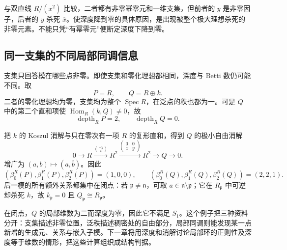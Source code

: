 与双直线 \(R/(x^2)\) 比较，二者都有非零幂零元和一维支集，但前者的 \(y\) 是非零因子，后者的 \(y\) 杀死 \(\overline x\)。使深度降到零的具体原因，是出现被整个极大理想杀死的非零元素。不能只凭“有幂零元”便断定深度下降到零。

\subsection{同一支集的不同局部同调信息}
\label{g5:subsec:0805:04}

支集只回答模在哪些点非零。即使支集和零化理想都相同，深度与 Betti 数仍可能不同。取
\[
	P=R,\qquad Q=R\oplus k.
\]
二者的零化理想均为零，支集均为整个 \(\operatorname{Spec}R\)，在泛点的秩也都为一。可是 \(Q\) 中的第二个直和项使 \(\operatorname{Hom}_R(k,Q)\ne0\)，故
\[
	\operatorname{depth}_R P=2,\qquad
	\operatorname{depth}_R Q=0.
\]

\ProseParagraphBreak

把 \(k\) 的 Koszul 消解与只在零次有一项 \(R\) 的复形直和，得到 \(Q\) 的极小自由消解
\[
	0\longrightarrow R
	\xrightarrow{\binom{-y}{x}}R^2
	\xrightarrow{\left(\begin{smallmatrix}0&0\\ x&y\end{smallmatrix}\right)}
	R^2\longrightarrow Q\longrightarrow0.
\]
增广为 \((a,b)\mapsto(a,\overline b)\)。因此
\[
	(\beta_0^R(P),\beta_1^R(P),\beta_2^R(P))=(1,0,0),
	\qquad
	(\beta_0^R(Q),\beta_1^R(Q),\beta_2^R(Q))=(2,2,1).
\]
后一模的所有额外关系都集中在闭点：若 \(\mathfrak p\ne\mathfrak n\)，可取 \(a\in\mathfrak n\setminus\mathfrak p\)；它在 \(R_{\mathfrak p}\) 中可逆却杀死 \(k\)，故 \(k_{\mathfrak p}=0\) 且 \(Q_{\mathfrak p}\cong R_{\mathfrak p}\)。

\ProseParagraphBreak

在闭点，\(Q\) 的局部维数为二而深度为零，因此它不满足 \(S_1\)。这个例子把三种资料分开：支集描述非零位置，泛秩描述稠密处的自由部分，局部同调则能发现某一点新增的生成元、关系与嵌入子模。下一章将用深度和消解讨论局部环的正则性及深度等于维数的情形，把这些计算组织成结构判据。

